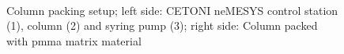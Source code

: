 \begin{figure}[h]
          \begin{subfigure}{0.49\textwidth}
                  \flushleft
          \end{subfigure}\hfill
        \begin{subfigure}{0.49\textwidth}
                \flushright
        \end{subfigure}
        \\
        
        \caption[Column packing setup]{Column packing setup; left side: CETONI neMESYS control station (1), column (2) and syring pump (3); right side: Column packed with \gls{pmma} matrix material }
        \label{fig:Packing_Setup_Column}
  \end{figure}  




